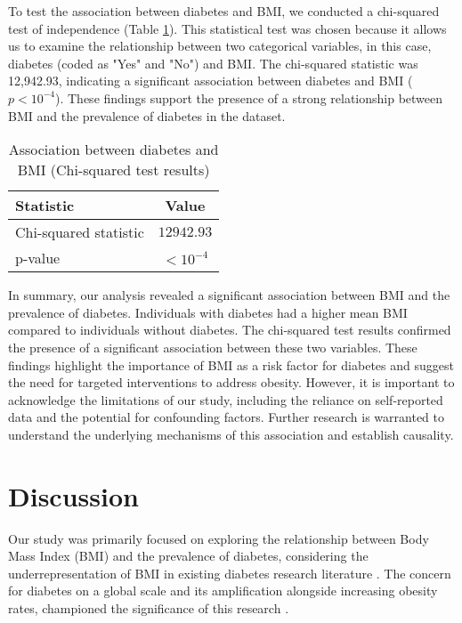 \documentclass[11pt]{article}
\begin{document}
To test the association between diabetes and BMI, we conducted a chi-squared test of independence (Table \ref{table:chi_squared_test}). This statistical test was chosen because it allows us to examine the relationship between two categorical variables, in this case, diabetes (coded as "Yes" and "No") and BMI. The chi-squared statistic was 12,942.93, indicating a significant association between diabetes and BMI ($p < 10^{-4}$). These findings support the presence of a strong relationship between BMI and the prevalence of diabetes in the dataset.\begin{table}[ht]
\centering
\caption{Association between diabetes and BMI (Chi-squared test results)}
\label{table:chi_squared_test}
\begin{tabular}{lc}
\toprule
Statistic & Value \\
\midrule
Chi-squared statistic & $12942.93$  \\
p-value & $<10^{-4}$ \\
\bottomrule
\end{tabular}
\end{table}

In summary, our analysis revealed a significant association between BMI and the prevalence of diabetes. Individuals with diabetes had a higher mean BMI compared to individuals without diabetes. The chi-squared test results confirmed the presence of a significant association between these two variables. These findings highlight the importance of BMI as a risk factor for diabetes and suggest the need for targeted interventions to address obesity. However, it is important to acknowledge the limitations of our study, including the reliance on self-reported data and the potential for confounding factors. Further research is warranted to understand the underlying mechanisms of this association and establish causality.

\section*{Discussion}

Our study was primarily focused on exploring the relationship between Body Mass Index (BMI) and the prevalence of diabetes, considering the underrepresentation of BMI in existing diabetes research literature \cite{Uloko2018PrevalenceAR}. The concern for diabetes on a global scale and its amplification alongside increasing obesity rates, championed the significance of this research \cite{Mokdad2001TheCE}. 
\end{document}
